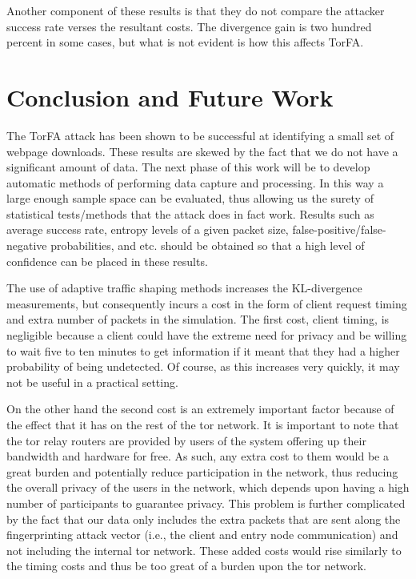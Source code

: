 \documentclass{usenixsubmit}
\begin{document}
Another component of these results is that they do not compare the attacker
success rate verses the resultant costs. The divergence gain is two hundred
percent in some cases, but what is not evident is how this affects TorFA. 

\section{Conclusion and Future Work}
The TorFA attack has been shown to be successful at identifying a small 
set of webpage downloads. These results are skewed by the fact that we
do not have a significant amount of data. The next phase of this work will
be to develop automatic methods of performing data capture and processing. In 
this way a large enough sample space can be
evaluated, thus allowing us the surety of statistical tests/methods that
the attack does in fact work. Results such as average success rate, entropy
levels of a given packet size, false-positive/false-negative probabilities, 
and etc. should be obtained so that a high level of confidence can be placed 
in these results. 

The use of adaptive traffic shaping methods increases the KL-divergence 
measurements, but consequently incurs a cost in the form of client request 
timing and extra number of packets in the simulation. The first cost, 
client timing, is negligible because a client could have the extreme 
need for privacy and be willing to wait five to ten minutes to get 
information if it meant that they had a higher probability of being 
undetected. Of course, as this increases very quickly, it may not be useful 
in a practical setting. 

On the other hand the second cost is an extremely important factor because of 
the effect that it has on the rest of the tor network. It is important to note 
that the tor relay routers are provided by users of the system offering up 
their bandwidth and hardware for free. As such, any extra cost to them would 
be a great burden and potentially reduce participation in the network, thus 
reducing the overall privacy of the users in the network, which depends upon 
having a high number of participants to guarantee privacy. This problem is 
further complicated by the fact that our data only includes the extra packets 
that are sent along the fingerprinting attack vector (i.e., the client and 
entry node communication) and not including the internal tor network. These 
added costs would rise similarly to the timing costs and thus be too great of 
a burden upon the tor network. 
\end{document}
